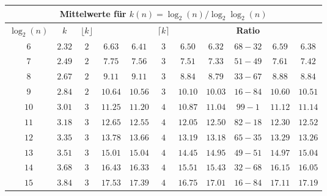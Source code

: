 
\begin{center}
\begin{tabular}{|c|c||c|c|c||c|c|c||c|c|c|}
        	\hline
        	\multicolumn{11}{|c|}{\ccb \textbf{Mittelwerte für $k(n) = \log_2(n) / \log_2\log_2(n)$}}\\
        	\hline
        	\hline
        	\multicolumn{1}{|c|}{\cca \textbf{$\log_2(n)$}}&
        	\multicolumn{1}{c|}{\cca \textbf{$k$}}&
        	\multicolumn{1}{c|}{\cca \textbf{$\lfloor k\rfloor$}}&
        	\multicolumn{1}{c|}{\cca \textbf{\fgm}}&
        	\multicolumn{1}{c|}{\cca \textbf{\fgr}}&
        	\multicolumn{1}{c|}{\cca \textbf{$\lceil k\rceil$}}&
        	\multicolumn{1}{c|}{\cca \textbf{\fgm}}&
        	\multicolumn{1}{c|}{\cca \textbf{\fgr}}&
        	\multicolumn{1}{c|}{\cca \textbf{Ratio}}&
        	\multicolumn{1}{c|}{\cca \textbf{\fgm}}&
        	\multicolumn{1}{c|}{\cca \textbf{\fgr}}\\
        	\hline
        	$6$&$2.32$&$2$& $6.63$&$6.41$ &$3$& $6.50$&$6.32$ &$68-32$&$6.59$ &$6.38$  \\
            \hline
            $7$&$2.49$&$2$&$7.75$ &$7.56$ &$3$& $7.51$ &$7.33$ &$51-49$&$7.61$ &$7.42$  \\
            \hline
            $8$&$2.67$&$2$&$9.11$ &$9.11$ &$3$&$8.84$ &$8.79$ &$33-67$&$8.88$ & $8.84$ \\
            \hline
            $9$&$2.84$&$2$&$10.64$ &$10.56$ &$3$&$10.10$ &$10.03$ &$16-84$&$10.60$ &$10.51$  \\
            \hline
            $10$&$3.01$&$3$&$11.25$ &$11.20$ &$4$&$10.87$ &$11.04$ &$99-1$&$11.12$ &$11.14$  \\
            \hline
            $11$&$3.18$&$3$&$12.65$ &$12.55$ &$4$&$12.05$&$12.50$ &$82-18$&$12.30$ &$12.52$  \\
            \hline
            $12$&$3.35$&$3$&$13.78$ &$13.66$ &$4$&$13.19$&$13.18$  &$65-35$&$13.29$ &$13.26$  \\
            \hline
            $13$&$3.51$&$3$&$15.01$ &$15.04$ &$4$&$14.45$ &$14.95$  &$49-51$&$14.97$ &$15.04$  \\
            \hline
            $14$&$3.68$&$3$&$16.43$ &$16.33$ &$4$& $15.51$ &$15.43$  &$32-68$&$16.15$ &$16.05$  \\
            \hline
            $15$&$3.84$&$3$&$17.53$ &$17.39$ &$4$& $16.75$ &$17.01$  &$16-84$&$17.11$ &$17.19$  \\

\end{tabular}
\end{center}
